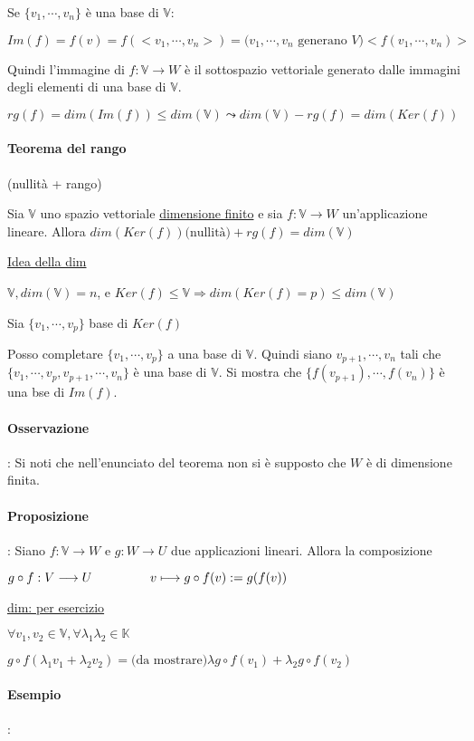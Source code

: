 \documentclass{article}
\newcommand{\ul}[1]{\underline{#1}}
\newcommand{\K}{\mathbb{K}}
\newcommand{\V}{\mathbb{V}}
\begin{document}
	Se $\{v_1,\cdots,v_n\}$ è una base di $\V$:

$Im(f)=f(v)=f(<v_1,\cdots,v_n>)=\text{($v_1,\cdots,v_n$ generano $V$)}<f(v_1,\cdots,v_n)>$

	Quindi l'immagine di $f:\V\rightarrow W$ è il sottospazio vettoriale generato dalle immagini degli elementi di una base di $\V$.

$rg(f)=dim(Im(f))\le dim(\V)\leadsto dim(\V)-rg(f)=dim(Ker(f))$


	\paragraph{Teorema del rango} (nullità + rango)

	Sia $\V$ uno spazio vettoriale \ul{dimensione finito} e sia $f:\V\rightarrow W$ un'applicazione lineare. Allora $dim(Ker(f))\text{(nullità)}+rg(f)=dim(\V)$

	\ul{Idea della dim}

$\V,dim(\V)=n$, e $Ker(f)\le\V\Rightarrow dim(Ker(f)=p)\le dim(\V)$

	Sia $\{v_1,\cdots,v_p\}$ base di $Ker(f)$

	Posso completare $\{v_1,\cdots,v_p\}$ a una base di $\V$.
	Quindi siano $v_{p+1},\cdots,v_n$ tali che $\{v_1,\cdots,v_p,v_{p+1},\cdots,v_n\}$ è una base di $\V$.
	Si mostra che $\{f(v_{p+1}),\cdots,f(v_n)\}$ è una bse di $Im(f)$.
	\paragraph{Osservazione}: Si noti che nell'enunciato del teorema non si è supposto che $W$ è di dimensione finita.

	\paragraph{Proposizione}: Siano $f:\V\rightarrow W$ e $g:W\rightarrow U$ due applicazioni lineari. Allora la composizione

$g\circ f:V\longrightarrow U\\\hspace*{4.6em}v\longmapsto g\circ f(v):=g(f(v))$

	\ul{dim: per esercizio}

$\forall v_1,v_2\in\V,\forall\lambda_1\lambda_2\in\K$

$g\circ f(\lambda_1v_1+\lambda_2v_2)=\text{(da mostrare)}\lambda g\circ f(v_1)+\lambda_2 g\circ f(v_2)$

	\paragraph{Esempio}:
\end{document}
